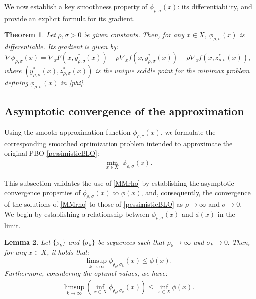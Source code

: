 \documentclass{article}
\newtheorem{theorem}{Theorem}[section]
\newtheorem{lemma}[theorem]{Lemma}
\begin{document}
We now establish a key smoothness property of $\phi_{\rho,\sigma}(x)$: its differentiability, and provide an explicit formula for its gradient.
\begin{theorem}\label{differentiable}
    Let $\rho, \sigma >0$ be given constants. Then, for any $x \in X$, $ \phi_{\rho,\sigma}(x)$ is differentiable. Its gradient is given by:
    \begin{equation}\label{gradient_phi}
    \nabla \phi_{\rho,\sigma}(x) =  \nabla_xF(x,y_{\rho,\sigma}^*(x)) - \rho \nabla_x f(x,y_{\rho,\sigma}^*(x)) + \rho \nabla_x f(x,z_{\rho,\sigma}^*(x)) ,
    \end{equation}
    where $(y_{\rho,\sigma}^*(x),z_{\rho,\sigma}^*(x))$ is the unique saddle point %
    for the minimax problem defining $ \phi_{\rho,\sigma}(x)$ in \eqref{phi}.
\end{theorem}


\subsection{Asymptotic convergence of the approximation}

Using the smooth approximation function $\phi_{\rho,\sigma}(x)$, we formulate the corresponding smoothed optimization problem intended to approximate the original PBO \eqref{pessimisticBLO}:
\begin{align}\label{MMrho}
   \min_{x\in {X}}\;\phi_{\rho,\sigma}(x).
\end{align}

This subsection validates the use of \eqref{MMrho} by establishing the asymptotic convergence properties of $\phi_{\rho,\sigma}(x)$ to $\phi(x)$, and, consequently, the convergence of the solutions of \eqref{MMrho} to those of \eqref{pessimisticBLO} as $\rho \rightarrow \infty$ and $\sigma \rightarrow 0$. We begin by establishing a relationship between  $\phi_{\rho,\sigma}(x)$ and $\phi(x)$ in the limit.

	 \begin{lemma}\label{lem21}
     Let $\{\rho_k\}$ and $\{\sigma_k\}$ be sequences such that $\rho_k \rightarrow \infty$ and $\sigma_k \rightarrow 0$. Then, for any $x \in X$, it holds that:
     \begin{equation}\label{limsupphiapp}
         	 	\limsup\limits_{k\to\infty} \phi_{\rho_k, \sigma_k}(x)\le\phi(x).
     \end{equation}
Furthermore, considering the optimal values, we have:
	\begin{align}\label{minimallimitapp}
	 		\limsup\limits_{k\to\infty} \left(\inf_{ x\in {X}}\phi_{\rho_k, \sigma_k}(x)\right)\le\inf_{x\in {X}}\phi (x).
	 	\end{align} 
	 \end{lemma}
\end{document}

